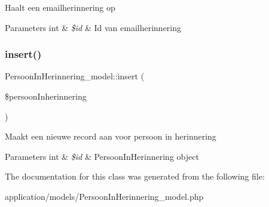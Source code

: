 Haalt een emailherinnering op 
\begin{DoxyParams}[1]{Parameters}
int & {\em \$id} & Id van emailherinnering \\
\hline
\end{DoxyParams}
\mbox{\label{class_persoon_in_herinnering__model_ab19b43169595548f27dd52a93a81ab9b}} 
\subsubsection{\texorpdfstring{insert()}{insert()}}
{\footnotesize\ttfamily Persoon\+In\+Herinnering\+\_\+model\+::insert (\begin{DoxyParamCaption}\item[{}]{\$persoon\+Inherinnering }\end{DoxyParamCaption})}

Maakt een nieuwe record aan voor persoon in herinnering 
\begin{DoxyParams}[1]{Parameters}
int & {\em \$id} & Persoon\+In\+Herinnering object \\
\hline
\end{DoxyParams}


The documentation for this class was generated from the following file\+:\begin{DoxyCompactItemize}
\item 
application/models/Persoon\+In\+Herinnering\+\_\+model.\+php\end{DoxyCompactItemize}

